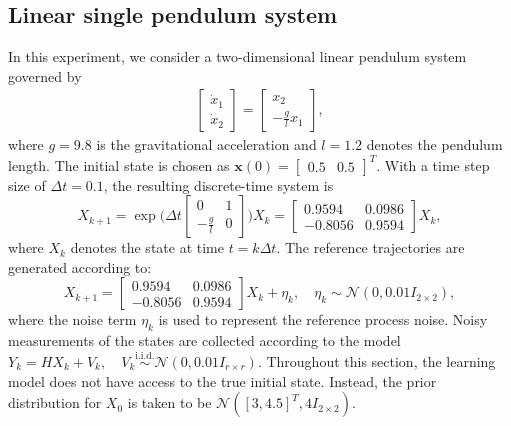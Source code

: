 \documentclass[preprint,3p,times]{elsarticle}
\begin{document}
\subsection{Linear single pendulum system}
\label{sec:low_dimension}
In this experiment, we consider a two-dimensional linear pendulum system governed by
\begin{align}
\begin{bmatrix}\dot{x}_1 \\ \dot{x}_2 \end{bmatrix} = 
\begin{bmatrix}x_2 \\ -\tfrac{g}{l}x_1 \end{bmatrix},
\end{align}
where $g=9.8$ is the gravitational acceleration and $l=1.2$ denotes the pendulum length. The initial state is chosen as $\mathbf{x}(0)=\begin{bmatrix}0.5 & 0.5\end{bmatrix}^T$. With a time step size of $\Delta t=0.1$, the resulting discrete-time system is 
\begin{equation}
X_{k+1} = \exp\bigg (\Delta t\begin{bmatrix}0 & 1 \\ -\frac{g}{l}&0\end{bmatrix}\bigg )X_k =\begin{bmatrix}0.9594 & 0.0986 \\ -0.8056 & 0.9594 \end{bmatrix}X_k, 
\label{eq:linear_pendulum_dt}
\end{equation}
where $X_k$ denotes the state at time $t=k\Delta t$. The reference trajectories are generated according to:
\begin{equation}
X_{k+1} = \begin{bmatrix}0.9594 & 0.0986 \\ -0.8056 & 0.9594 \end{bmatrix}X_k + \eta_k, \quad \eta_k \sim \mathcal{N}(0, 0.01I_{2\times2}),
\label{eq:linear_pendulum_dt_simulation}
\end{equation}
where the noise term $\eta_k$ is used to represent the reference process noise. Noisy measurements of the states are collected according to the model $Y_k = HX_k + V_k, \quad V_k \overset{\mathrm{i.i.d.}}{\sim} \mathcal{N}(0,0.01I_{r \times r})$. Throughout this section, the learning model does not have access to the true initial state. Instead, the prior distribution for $X_0$ is taken to be $\mathcal{N}([
    3, 4.5
]^T, 4I_{2\times2})$.
\end{document}
